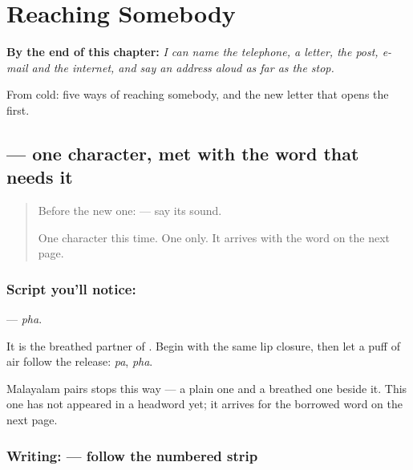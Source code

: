 
\chapter{Reaching Somebody}
\label{ch:ml-message}

\begin{chapteropening}
\textbf{By the end of this chapter:} \emph{I can name the telephone, a letter, the post, e-mail and the internet, and say an address aloud as far as the stop.}

From cold: five ways of reaching somebody, and the new letter that opens the first.
\end{chapteropening}

\section[\texorpdfstring{\ml{ഫ} (pha)}{ഫ (pha)}]{ — one character, met with the word that needs it}

\label{lesson:ML-S148-letter-pha}



\begin{quote}
Before the new one: \textbf{} — say its sound.

One character this time. One only. It arrives with the word on the next page.
\end{quote}

\subsection*{Script you'll notice: }
\textbf{} — \emph{pha}.

It is the breathed partner of \textbf{}. Begin with the same lip closure, then let a puff of air follow the release: \textbf{} \emph{pa}, \textbf{} \emph{pha}.

Malayalam pairs stops this way — a plain one and a breathed one beside it. This one has not appeared in a headword yet; it arrives for the borrowed word on the next page.

\subsection*{Writing:  — follow the numbered strip}


